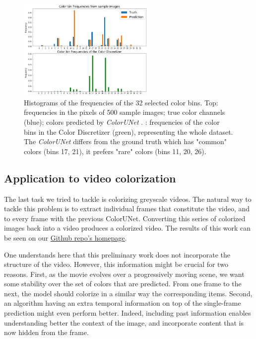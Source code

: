 \documentclass[10pt,twocolumn,letterpaper]{article}
\begin{document}
\begin{figure}
\begin{center}
\includegraphics[width=250px]{color_histogram}
\caption{Histograms of the frequencies of the 32 selected color bins. Top: frequencies in the pixels of 500 sample images; true color channels (blue); colors predicted by \textit{ColorUNet} . : frequencies of the color bins in the Color Discretizer (green), representing the whole dataset. The \textit{ColorUNet} differs from the ground truth which has "common" colors (bins 17, 21), it prefers "rare" colors (bins 11, 20, 26). }
\label{histogram}
\end{center}
\end{figure}


\subsection{Application to video colorization}

The last task we tried to tackle is colorizing greyscale videos. The natural way to tackle this problem is to extract individual frames that constitute the video, and to every frame with the previous ColorUNet. Converting this series of colorized images back into a video produces a colorized video. The results of this work can be seen on our \href{https://github.com/vincentbillaut/all-colors-matter}{Github repo's homepage}.

One understands here that this preliminary work does not incorporate the structure of the video. However, this information might be crucial for two reasons. First, as the movie evolves over a progressively moving scene, we want some stability over the set of colors that are predicted. From one frame to the next, the model should colorize in a similar way the corresponding items. Second, an algorithm having an extra temporal information on top of the single-frame prediction might even perform better. Indeed, including past information enables understanding better the context of the image, and incorporate content that is now hidden from the frame.
\end{document}
